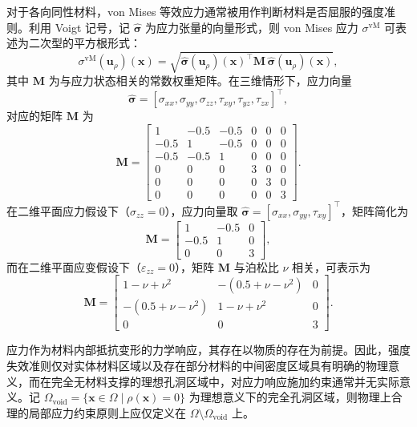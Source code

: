 对于各向同性材料，von Mises 等效应力通常被用作判断材料是否屈服的强度准则。利用 Voigt 记号，记 $\hat{\boldsymbol{\sigma}}$ 为应力张量的向量形式，则 von Mises 应力 $\sigma^{\text{vM}}$ 可表述为二次型的平方根形式：
\[
\sigma^{\text{vM}}(\boldsymbol{u}_\rho)(\boldsymbol{x}) = \sqrt{ \hat{\boldsymbol{\sigma}}(\boldsymbol{u}_\rho)(\boldsymbol{x})^\top \boldsymbol{M} \, \hat{\boldsymbol{\sigma}}(\boldsymbol{u}_\rho)(\boldsymbol{x})},
\]
其中 $\boldsymbol{M}$ 为与应力状态相关的常数权重矩阵。在三维情形下，应力向量
\[
\hat{\boldsymbol{\sigma}} = [\sigma_{xx}, \sigma_{yy}, \sigma_{zz}, \tau_{xy}, \tau_{yz}, \tau_{zx}]^\top,
\]
对应的矩阵 $\boldsymbol{M}$ 为
\[
\boldsymbol{M} = 
\begin{bmatrix} 
	1 & -0.5 & -0.5 & 0 & 0 & 0 \\ 
	-0.5 & 1 & -0.5 & 0 & 0 & 0 \\ 
	-0.5 & -0.5 & 1 & 0 & 0 & 0 \\ 
	0 & 0 & 0 & 3 & 0 & 0 \\ 
	0 & 0 & 0 & 0 & 3 & 0 \\ 
	0 & 0 & 0 & 0 & 0 & 3 
\end{bmatrix}.
\]
在二维平面应力假设下（$\sigma_{zz} = 0$），应力向量取 $\hat{\boldsymbol{\sigma}} = [\sigma_{xx}, \sigma_{yy}, \tau_{xy}]^\top$，矩阵简化为
\[
\boldsymbol{M} = 
\begin{bmatrix} 
	1 & -0.5 & 0 \\ -0.5 & 1 & 0 \\ 0 & 0 & 3 
\end{bmatrix},
\]
而在二维平面应变假设下（$\varepsilon_{zz} = 0$），矩阵 $\boldsymbol{M}$ 与泊松比 $\nu$ 相关，可表示为
\[
\boldsymbol{M} = 
\begin{bmatrix} 
	1-\nu+\nu^2 & -(0.5+\nu-\nu^2) & 0 \\ -(0.5+\nu-\nu^2) & 1-\nu+\nu^2 & 0 \\ 0 & 0 & 3 
\end{bmatrix}.
\]

应力作为材料内部抵抗变形的力学响应，其存在以物质的存在为前提。因此，强度失效准则仅对实体材料区域以及存在部分材料的中间密度区域具有明确的物理意义，而在完全无材料支撑的理想孔洞区域中，对应力响应施加约束通常并无实际意义。记 $\Omega_{\text{void}} = \{ \boldsymbol{x} \in \Omega \mid \rho(\boldsymbol{x}) = 0 \}$ 为理想意义下的完全孔洞区域，则物理上合理的局部应力约束原则上应仅定义在 $\Omega \setminus \Omega_{\text{void}}$ 上。

